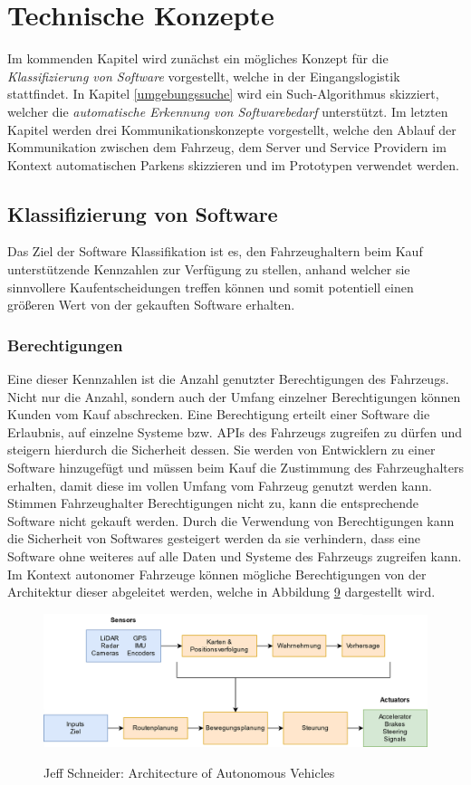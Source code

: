 \section{Technische Konzepte}\label{technische_konzepte}
Im kommenden Kapitel wird zunächst ein mögliches Konzept für die\textit{ Klassifizierung von Software} vorgestellt, welche in der Eingangslogistik stattfindet. In Kapitel \ref{umgebungssuche} wird ein Such-Algorithmus skizziert, welcher die \textit{automatische Erkennung von Softwarebedarf} unterstützt. Im letzten Kapitel werden drei Kommunikationskonzepte vorgestellt, welche den Ablauf der Kommunikation zwischen dem Fahrzeug, dem Server und Service Providern im Kontext automatischen Parkens skizzieren und im Prototypen verwendet werden.
\subsection{Klassifizierung von Software}\label{sw_klassifizierung}
Das Ziel der Software Klassifikation ist es, den Fahrzeughaltern beim Kauf unterstützende Kennzahlen zur Verfügung zu stellen, anhand welcher sie sinnvollere Kaufentscheidungen treffen können und somit potentiell einen größeren Wert von der gekauften Software erhalten.

\subsubsection{Berechtigungen}
Eine dieser Kennzahlen ist die Anzahl genutzter Berechtigungen des Fahrzeugs. Nicht nur die Anzahl, sondern auch der Umfang einzelner Berechtigungen können Kunden vom Kauf abschrecken.\cite[Vgl. S. 107]{android} Eine Berechtigung erteilt einer Software die Erlaubnis, auf einzelne Systeme bzw. APIs des Fahrzeugs zugreifen zu dürfen und steigern hierdurch die Sicherheit dessen. Sie werden von Entwicklern zu einer Software hinzugefügt und müssen beim Kauf die Zustimmung des Fahrzeughalters erhalten, damit diese im vollen Umfang vom Fahrzeug genutzt werden kann. Stimmen Fahrzeughalter Berechtigungen nicht zu, kann die entsprechende Software nicht gekauft werden. Durch die Verwendung von Berechtigungen kann die Sicherheit von Softwares gesteigert werden da sie verhindern, dass eine Software ohne weiteres auf alle Daten und Systeme des Fahrzeugs zugreifen kann. Im Kontext autonomer Fahrzeuge können mögliche Berechtigungen von der Architektur dieser abgeleitet werden, welche in Abbildung \hyperref[img:av_architecture]{9} dargestellt wird. 
\begin{figure}[H]
	\centering
	\includegraphics[width=0.95\columnwidth]{pictures/arichtecture_AV.png}
	\label{img:av_architecture}
	\caption{Jeff Schneider: Architecture of Autonomous Vehicles}
\end{figure}

